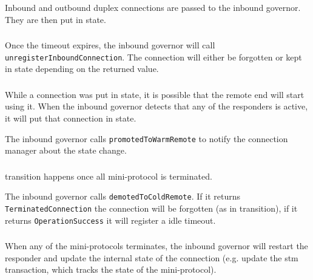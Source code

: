 \subsubsection{\NewConnection}
Inbound and outbound duplex connections are passed to the inbound governor.
They are then put in \RemoteIdle{} state.

\subsubsection{\CommitRemote}
Once the \RemoteIdle{} timeout expires, the inbound governor will call
\texttt{unregisterInboundConnection}.  The
connection will either be forgotten or kept in \RemoteCold{} state depending on the returned value.

\subsubsection{\AwakeRemote}
While a connection was put in \RemoteIdle{} state, it is possible that the
remote end will start using it.  When the inbound governor detects that any
of the responders is active, it will put that connection in \RemoteWarm{} state.

\begin{detail}
  The inbound governor calls \texttt{promotedToWarmRemote} to notify the
  connection manager about the state change.
\end{detail}

\subsubsection{\WaitIdleRemote}
\WaitIdleRemote{} transition happens once all mini-protocol is terminated.

\begin{detail}
  The inbound governor calls \texttt{demotedToColdRemote}.   If it returns
  \texttt{TerminatedConnection} the connection will be forgotten (as in
  \MuxTerminated{} transition), if it returns \texttt{OperationSuccess} it will
  register a idle timeout.
\end{detail}

\subsubsection{\MiniProtocolTerminated}
When any of the mini-protocols terminates, the inbound governor will restart the
responder and update the internal state of the connection (e.g. update the stm
transaction, which tracks the state of the mini-protocol).

